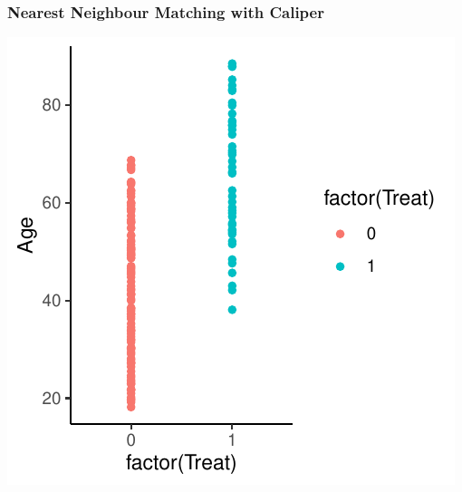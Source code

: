 \documentclass[xcolor=x11names,compress]{beamer}\usepackage[]{graphicx}\usepackage[]{color}
\makeatletter
\def\maxwidth{ %
  \ifdim\Gin@nat@width>\linewidth
    \linewidth
  \else
    \Gin@nat@width
  \fi
}
\newenvironment{knitrout}{}{} %
\renewcommand{\(}{\begin{columns}}
\renewcommand{\)}{\end{columns}}
\newcommand{\<}[1]{\begin{column}{#1}}
\renewcommand{\>}{\end{column}}
\makeatother
\begin{document}
\begin{frame}
\frametitle{Nearest Neighbour Matching with Caliper}
\begin{center}
\begin{knitrout}
\color{fgcolor}
\includegraphics[width=\maxwidth]{figure/nearest_matching_1_caliper-1} 

\end{knitrout}
\end{center}
\end{frame}
\end{document}
